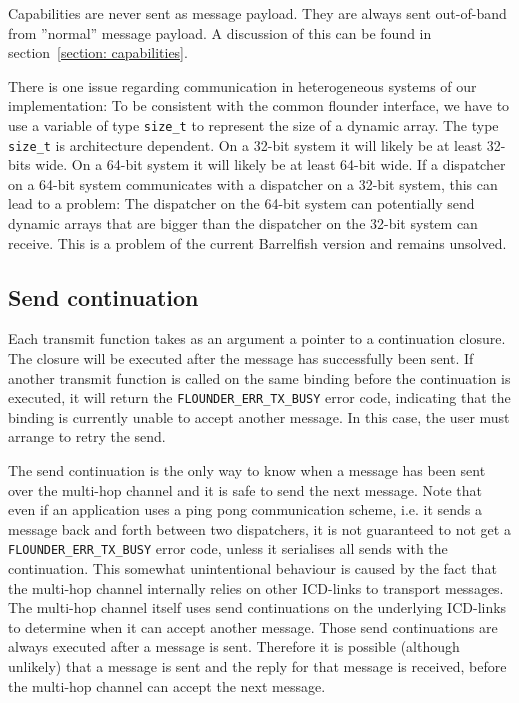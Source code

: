 \documentclass[a4paper,twoside]{report} %
\begin{document}
Capabilities are never sent as message payload. They are always sent out-of-band from ''normal'' message payload. A discussion of this can be found in section~\ref{section: capabilities}.

There is one issue regarding communication in heterogeneous systems of our implementation: To be consistent  with the common flounder interface, we have to use a variable of type \texttt{size\_t} to represent the size of a dynamic array. The type \texttt{size\_t} is architecture dependent. On a 32-bit system it will likely be at least 32-bits wide. On a 64-bit system it will likely be at least 64-bit wide. If a dispatcher on a 64-bit system communicates with a dispatcher on a 32-bit system, this can lead to a problem: The dispatcher on the 64-bit system can potentially send dynamic arrays that are bigger than the dispatcher on the 32-bit system can receive. This is a problem of the current Barrelfish version and remains unsolved.


\subsection{Send continuation}
Each transmit function takes as an argument a pointer to a continuation closure. The closure will be executed after the message has successfully been sent. If another transmit function is called on the same binding before the continuation is executed, it will return the \texttt{FLOUNDER\_ERR\_TX\_BUSY} error code, indicating that the binding is currently unable to accept another message. In this case, the user must arrange to retry the send.

The send continuation is the only way to know when a message has been sent over the multi-hop channel and it is safe to send the next message. Note that even if an application uses a ping pong communication scheme, i.e. it sends a message back and forth between two dispatchers, it is not guaranteed to not get a \texttt{FLOUNDER\_ERR\_TX\_BUSY} error code, unless it serialises all sends with the continuation. This somewhat unintentional behaviour is caused by the fact that the multi-hop channel internally relies on other ICD-links to transport messages. The multi-hop channel itself uses send continuations on the underlying ICD-links to determine when it can accept another message. Those send continuations are always executed after a message is sent. Therefore it is possible (although unlikely) that a message is sent and the reply for that message is received, before the multi-hop channel can accept the next message.
\end{document}
